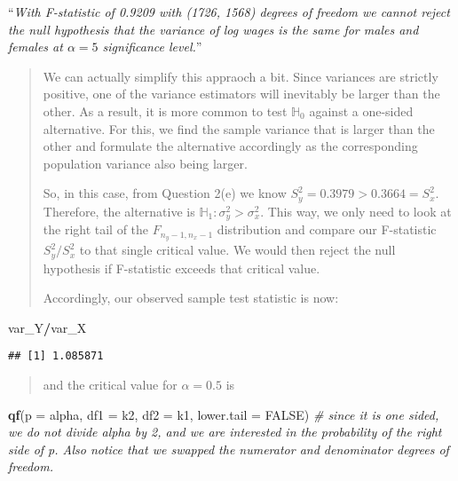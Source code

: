 \documentclass[
]{article}
\newenvironment{Shaded}{\begin{snugshade}}{\end{snugshade}}
\newcommand{\AttributeTok}[1]{\textcolor[rgb]{0.13,0.29,0.53}{#1}}
\newcommand{\CommentTok}[1]{\textcolor[rgb]{0.56,0.35,0.01}{\textit{#1}}}
\newcommand{\ConstantTok}[1]{\textcolor[rgb]{0.56,0.35,0.01}{#1}}
\newcommand{\FunctionTok}[1]{\textcolor[rgb]{0.13,0.29,0.53}{\textbf{#1}}}
\newcommand{\NormalTok}[1]{#1}
\newcommand{\SpecialCharTok}[1]{\textcolor[rgb]{0.81,0.36,0.00}{\textbf{#1}}}
\begin{document}
``\emph{With F-statistic of 0.9209 with (1726, 1568) degrees of freedom
we cannot reject the null hypothesis that the variance of log wages is
the same for males and females at \(\alpha = 5%
\) significance level.}''

\begin{quote}
We can actually simplify this appraoch a bit. Since variances are
strictly positive, one of the variance estimators will inevitably be
larger than the other. As a result, it is more common to test
\(\mathbb{H}_0\) against a one-sided alternative. For this, we find the
sample variance that is larger than the other and formulate the
alternative accordingly as the corresponding population variance also
being larger.

So, in this case, from Question 2(e) we know
\(S_y^2 = 0.3979 > 0.3664 = S_x^2\). Therefore, the alternative is
\(\mathbb{H}_1: \sigma_y^2 > \sigma_x^2.\) This way, we only need to
look at the right tail of the \(F_{n_y-1,n_x-1}\) distribution and
compare our F-statistic \(S_y^2/S_x^2\) to that single critical value.
We would then reject the null hypothesis if F-statistic exceeds that
critical value.

Accordingly, our observed sample test statistic is now:
\end{quote}

\begin{Shaded}
\begin{Highlighting}[]
\NormalTok{var\_Y}\SpecialCharTok{/}\NormalTok{var\_X}
\end{Highlighting}
\end{Shaded}

\begin{verbatim}
## [1] 1.085871
\end{verbatim}

\begin{quote}
and the critical value for \(\alpha=0.5\) is
\end{quote}

\begin{Shaded}
\begin{Highlighting}[]
\FunctionTok{qf}\NormalTok{(}\AttributeTok{p =}\NormalTok{ alpha, }\AttributeTok{df1 =}\NormalTok{ k2, }\AttributeTok{df2 =}\NormalTok{ k1, }\AttributeTok{lower.tail =} \ConstantTok{FALSE}\NormalTok{) }\CommentTok{\# since it is one sided, we do not divide alpha by 2, and we are interested in the probability of the right side of p. Also notice that we swapped the numerator and denominator degrees of freedom.}
\end{Highlighting}
\end{Shaded}
\end{document}
